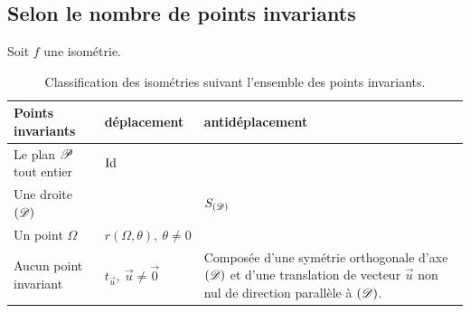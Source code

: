       \subsection{Selon le nombre de points invariants}
            Soit $f$ une isom\'etrie.
		      \begin{table}[h!]
			            \begin{tabularx}{\linewidth}{|p{.27\linewidth}|p{.18\linewidth}|X|}
                        \hline
                              \textbf{Points invariants} 
                                    & \textbf{d\'eplacement}   
                                          & \textbf{antid\'eplacement}
                                                \\
                        \hline
                              Le plan $\mathscr{P}$ tout entier            
                                    & $\mathrm{Id}$                    
                                          & 
                                                \\
                        \hline
                              Une droite $(\mathscr{D})$                    
                                    &                          
                                          & $S_{(\mathscr{D})}$
                                                \\
                        \hline
                              Un point $\Omega$                       
                                    & $r(\Omega,\theta),\ \theta\neq 0$ 
                                          & 
                                                \\
                        \hline
                              Aucun point invariant                   
                                    & $t_{\vec{u}},\ \vec{u}\neq\vec{0}$ 
                                          & \raggedright
                                            Compos\'ee d'une sym\'etrie orthogonale d'axe $(\mathscr{D})$ et 
                                            d'une translation de vecteur $\vec{u}$ non nul de 
                                            direction parall\`ele \`a $(\mathscr{D})$.
                                                 \tabularnewline[0\baselineskip]
                        \hline
		            \end{tabularx}
            \caption{Classification des isom\'etries suivant l'ensemble des points invariants.}
            \label{tab:classification des isometries}
            \end{table}

